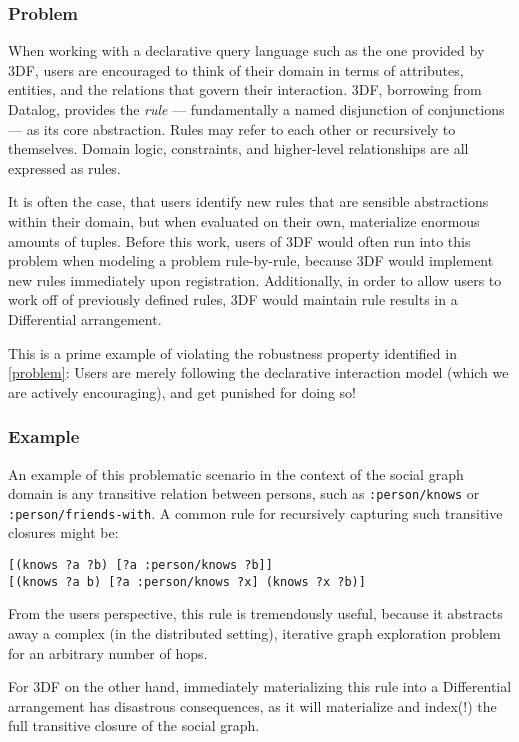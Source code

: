 \documentclass[../catalog.tex]{subfiles}
\begin{document}
\subsubsection{Problem}

When working with a declarative query language such as the one
provided by 3DF, users are encouraged to think of their domain in
terms of attributes, entities, and the relations that govern their
interaction. 3DF, borrowing from Datalog, provides the \emph{rule} —
fundamentally a named disjunction of conjunctions — as its core
abstraction. Rules may refer to each other or recursively to
themselves. Domain logic, constraints, and higher-level relationships
are all expressed as rules.

It is often the case, that users identify new rules that are sensible
abstractions within their domain, but when evaluated on their own,
materialize enormous amounts of tuples. Before this work, users of 3DF
would often run into this problem when modeling a problem
rule-by-rule, because 3DF would implement new rules immediately upon
registration. Additionally, in order to allow users to work off of
previously defined rules, 3DF would maintain rule results in a
Differential arrangement.

This is a prime example of violating the robustness property
identified in \ref{problem}: Users are merely following the
declarative interaction model (which we are actively encouraging), and
get punished for doing so!

\subsubsection{Example}

An example of this problematic scenario in the context of the social
graph domain is any transitive relation between persons, such as
\texttt{:person/knows} or \texttt{:person/friends-with}. A common rule
for recursively capturing such transitive closures might be:

\begin{verbatim}
[(knows ?a ?b) [?a :person/knows ?b]]
[(knows ?a b) [?a :person/knows ?x] (knows ?x ?b)]
\end{verbatim}

From the users perspective, this rule is tremendously useful, because
it abstracts away a complex (in the distributed setting), iterative
graph exploration problem for an arbitrary number of hops.

For 3DF on the other hand, immediately materializing this rule into a
Differential arrangement has disastrous consequences, as it will
materialize and index(!) the full transitive closure of the social
graph.
\end{document}
